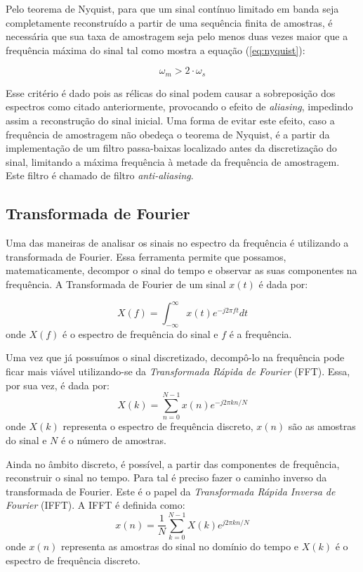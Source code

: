 \documentclass[]{IEEEtran}
\begin{document}
Pelo teorema de Nyquist, para que um sinal contínuo limitado em banda seja completamente reconstruído a partir de uma sequência finita de amostras, é necessária que sua taxa de amostragem seja pelo menos duas vezes maior que a frequência máxima do sinal tal como mostra a equação (\ref{eq:nyquist}):

\begin{equation}\label{eq:nyquist}
    \omega_{m} > 2 \cdot \omega_{s}
\end{equation}

Esse critério é dado pois as rélicas do sinal podem causar a sobreposição dos espectros como citado anteriormente, provocando o efeito de \textit{aliasing}, impedindo assim a reconstrução do sinal inicial. Uma forma de evitar este efeito, caso a frequência de amostragem não obedeça o teorema de Nyquist, é a partir da implementação de um filtro passa-baixas localizado antes da discretização do sinal, limitando a máxima frequência à metade da frequência de amostragem. Este filtro é chamado de filtro \textit{anti-aliasing}.

\subsection{Transformada de Fourier}
Uma das maneiras de analisar os sinais no espectro da frequência é utilizando a transformada de Fourier. Essa ferramenta permite que possamos, matematicamente, decompor o sinal do tempo e observar as suas componentes na frequência. A Transformada de Fourier de um sinal $x(t)$ é dada por:

\begin{equation}
     X(f) = \int_{-\infty}^{\infty} x(t) e^{-j2\pi ft} dt
\end{equation}
onde \(X(f)\) é o espectro de frequência do sinal e \(f\) é a frequência.

Uma vez que já possuímos o sinal discretizado, decompô-lo na frequência pode ficar mais viável utilizando-se da \textit{Transformada Rápida de Fourier} (FFT). Essa, por sua vez, é dada por:
\begin{equation}
    X(k) = \sum_{n=0}^{N-1} x(n) e^{-j2\pi kn/N} 
\end{equation}
onde \(X(k)\) representa o espectro de frequência discreto, \(x(n)\) são as amostras do sinal e \(N\) é o número de amostras.

Ainda no âmbito discreto, é possível, a partir das componentes de frequência, reconstruir o sinal no tempo. Para tal é preciso fazer o caminho inverso da transformada de Fourier. Este é o papel da \textit{Transformada Rápida Inversa de Fourier} (IFFT). A IFFT é definida como:
\begin{equation}
    x(n) = \frac{1}{N} \sum_{k=0}^{N-1} X(k) e^{j2\pi kn/N}
\end{equation}
onde \(x(n)\) representa as amostras do sinal no domínio do tempo e \(X(k)\) é o espectro de frequência discreto.
\end{document}
